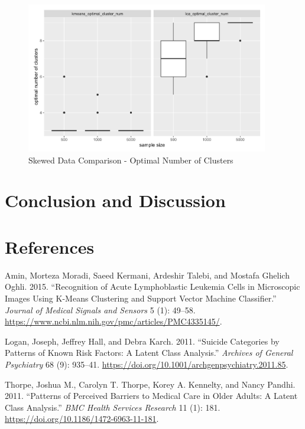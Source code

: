\documentclass[
]{article}
\newlength{\cslhangindent}
\newlength{\cslentryspacingunit} %
\newenvironment{CSLReferences}[2] %
 {%
  \setlength{\parindent}{0pt}
  \ifodd #1
  \let\oldpar\par
  \def\par{\hangindent=\cslhangindent\oldpar}
  \fi
  \setlength{\parskip}{#2\cslentryspacingunit}
 }%
 {}
\begin{document}
\begin{figure}
\centering
\includegraphics[width=4.16667in,height=\textheight]{report_image/skewed_data_num_clusters_results.png}
\caption{Skewed Data Comparison - Optimal Number of Clusters}
\end{figure}

\hypertarget{conclusion-and-discussion}{%
\section{Conclusion and Discussion}\label{conclusion-and-discussion}}

\hypertarget{references}{%
\section{References}\label{references}}

\hypertarget{refs}{}
\begin{CSLReferences}{1}{0}
\leavevmode{}%
Amin, Morteza Moradi, Saeed Kermani, Ardeshir Talebi, and Mostafa
Ghelich Oghli. 2015. {``Recognition of {Acute} {Lymphoblastic}
{Leukemia} {Cells} in {Microscopic} {Images} {Using} {K}-{Means}
{Clustering} and {Support} {Vector} {Machine} {Classifier}.''}
\emph{Journal of Medical Signals and Sensors} 5 (1): 49--58.
\url{https://www.ncbi.nlm.nih.gov/pmc/articles/PMC4335145/}.

\leavevmode{}%
Logan, Joseph, Jeffrey Hall, and Debra Karch. 2011. {``Suicide
{Categories} by {Patterns} of {Known} {Risk} {Factors}: {A} {Latent}
{Class} {Analysis}.''} \emph{Archives of General Psychiatry} 68 (9):
935--41. \url{https://doi.org/10.1001/archgenpsychiatry.2011.85}.

\leavevmode{}%
Thorpe, Joshua M., Carolyn T. Thorpe, Korey A. Kennelty, and Nancy
Pandhi. 2011. {``Patterns of Perceived Barriers to Medical Care in Older
Adults: A Latent Class Analysis.''} \emph{BMC Health Services Research}
11 (1): 181. \url{https://doi.org/10.1186/1472-6963-11-181}.

\end{CSLReferences}
\end{document}
